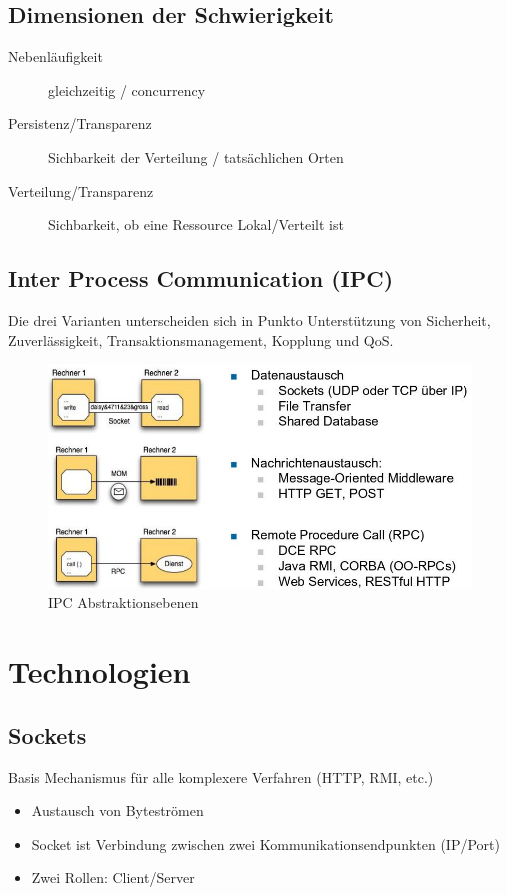 \subsection{Dimensionen der Schwierigkeit}

\begin{description}
	\item[Nebenläufigkeit] gleichzeitig / concurrency
	\item[Persistenz/Transparenz] Sichbarkeit der Verteilung / tatsächlichen Orten
	\item[Verteilung/Transparenz] Sichbarkeit, ob eine Ressource Lokal/Verteilt ist
\end{description}

\subsection{Inter Process Communication (IPC)}
Die drei Varianten unterscheiden sich in Punkto Unterstützung von Sicherheit, Zuverlässigkeit, Transaktionsmanagement, Kopplung und QoS.
\begin{figure}[h]
	\centering
	\includegraphics[width=0.7\linewidth]{img/ipc_abstraction_layers}
	\caption{IPC Abstraktionsebenen}
	\label{fig:ipcabstractionlayers}
\end{figure}


\section{Technologien}
\subsection{Sockets}

Basis Mechanismus für alle komplexere Verfahren (HTTP, RMI, etc.)
\begin{itemize}
	\item Austausch von Byteströmen
	\item Socket ist Verbindung zwischen zwei Kommunikationsendpunkten (IP/Port)
	\item Zwei Rollen: Client/Server
\end{itemize}

